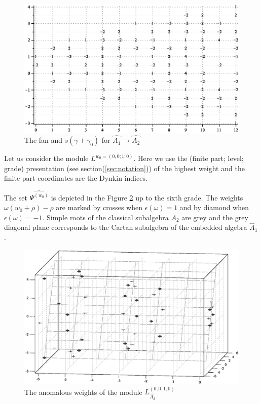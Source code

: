 \documentclass[12pt]{iopart}
\begin{document}
\begin{figure}[h!bt]
  \centering
  \includegraphics[width=135mm]{figure6.eps}
  \caption{The fan and $s(\gamma+\gamma_0)$ for $\hat{A_1}\longrightarrow \hat{A_2}$}
  \label{fig:AffineA2A1Fan}
\end{figure}

Let us consider the module $L^{w_0=(0,0;1;0)}$. Here we use the (finite part; level; grade)
presentation (see section(\ref{sec:notation})) of the highest weight and the finite part
coordinates are the Dynkin indices.

The set $\widehat{\Psi^{(w_0)}}$  is depicted in the Figure
\ref{fig:affine_A2_anom_point} up to the sixth grade.
The weights $\omega (w_0+\rho)-\rho$ are marked by crosses when $\epsilon(\omega)=1$ and
by diamond when $\epsilon(\omega)=-1$. Simple roots of the classical subalgebra $A_2$ are
grey and the grey diagonal plane corresponds to the Cartan subalgebra of
the embedded algebra $\hat{A}_1$.

\begin{figure}[h!tb]
  \includegraphics[width=140mm]{figure7.eps}
  \caption{The anomalous weights of the module $L^{(0,0;1;0)}_{\hat{A_2}}$}
  \label{fig:affine_A2_anom_point}
\end{figure}
\end{document}
